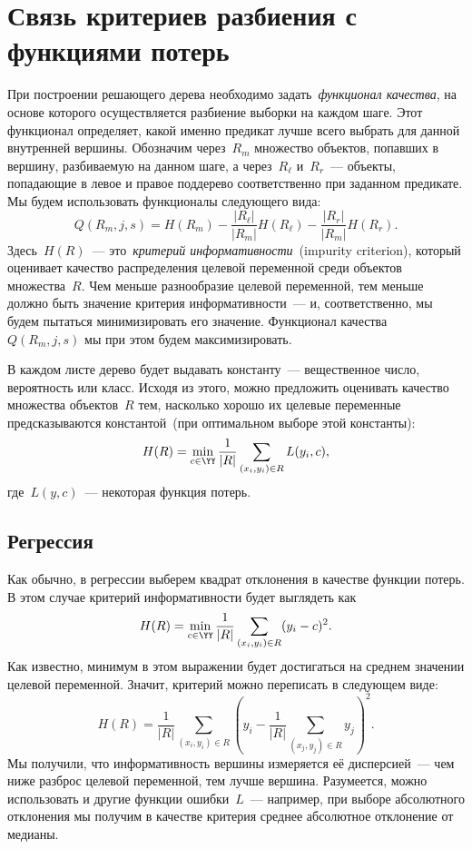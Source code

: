 \documentclass[12pt,a4paper]{article}
\begin{document}
\section{Связь критериев разбиения с функциями потерь}

При построении решающего дерева необходимо задать~\emph{функционал качества},
на основе которого осуществляется разбиение выборки на каждом шаге.
Этот функционал определяет, какой именно предикат лучше всего выбрать для данной внутренней вершины.
Обозначим через~$R_m$ множество объектов, попавших в вершину, разбиваемую на данном шаге,
а через~$R_\ell$ и~$R_r$~--- объекты, попадающие в левое и правое поддерево соответственно
при заданном предикате.
Мы будем использовать функционалы следующего вида:
\[
    Q(R_m, j, s)
    =
    H(R_m)
    -
    \frac{|R_\ell|}{|R_m|}
    H(R_\ell)
    -
    \frac{|R_r|}{|R_m|}
    H(R_r).
\]
Здесь~$H(R)$~--- это~\emph{критерий информативности}~(impurity criterion),
который оценивает качество распределения целевой переменной среди объектов множества~$R$.
Чем меньше разнообразие целевой переменной, тем меньше должно быть значение критерия информативности~---
и, соответственно, мы будем пытаться минимизировать его значение.
Функционал качества~$Q(R_m, j, s)$ мы при этом будем максимизировать.

В каждом листе дерево будет выдавать константу~--- вещественное число, вероятность
или класс.
Исходя из этого, можно предложить оценивать качество множества объектов~$R$ тем,
насколько хорошо их целевые переменные предсказываются константой~(при оптимальном выборе этой константы):
\[
    H(R)
    =
    \min_{c \in \YY}
    \frac{1}{|R|}
    \sum_{(x_i, y_i) \in R}
        L(y_i, c),
\]
где~$L(y, c)$~--- некоторая функция потерь.

\subsection{Регрессия}
Как обычно, в регрессии выберем квадрат отклонения в качестве функции потерь.
В этом случае критерий информативности будет выглядеть как
\[
    H(R)
    =
    \min_{c \in \YY}
    \frac{1}{|R|}
    \sum_{(x_i, y_i) \in R}
        (y_i - c)^2.
\]
Как известно, минимум в этом выражении будет достигаться на среднем значении целевой переменной.
Значит, критерий можно переписать в следующем виде:
\[
    H(R)
    =
    \frac{1}{|R|}
    \sum_{(x_i, y_i) \in R}
    \left(
        y_i
        -
        \frac{1}{|R|}
        \sum_{(x_j, y_j) \in R}
            y_j
    \right)^2.
\]
Мы получили, что информативность вершины измеряется её дисперсией~---
чем ниже разброс целевой переменной, тем лучше вершина.
Разумеется, можно использовать и другие функции ошибки~$L$~---
например, при выборе абсолютного отклонения мы получим в качестве критерия среднее абсолютное отклонение от медианы.
\end{document}
